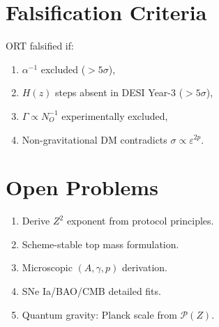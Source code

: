 \documentclass[12pt,a4paper]{article}
\numberwithin{equation}{section}
\theoremstyle{plain}
\theoremstyle{definition}
\theoremstyle{remark}
\newcommand{\Prot}{\ensuremath{\mathcal{P}}}
\newcommand{\Zed}{\ensuremath{Z}}
\newcommand{\eps}{\ensuremath{\varepsilon}}
\begin{document}
\section{Falsification Criteria}

ORT falsified if:
\begin{enumerate}[label=(\roman*)]
\item $\alpha^{-1}$ excluded ($>5\sigma$),
\item $H(z)$ steps absent in DESI Year-3 ($>5\sigma$),
\item $\Gamma \propto N_O^{-1}$ experimentally excluded,
\item Non-gravitational DM contradicts $\sigma \propto \eps^{2p}$.
\end{enumerate}

\section{Open Problems}

\begin{enumerate}[label=\textbf{OP.\arabic*}]
\item Derive $\Zed^2$ exponent from protocol principles.
\item Scheme-stable top mass formulation.
\item Microscopic $(A,\gamma,p)$ derivation.
\item SNe Ia/BAO/CMB detailed fits.
\item Quantum gravity: Planck scale from $\Prot(\Zed)$.
\end{enumerate}


\printbibliography
\end{document}
